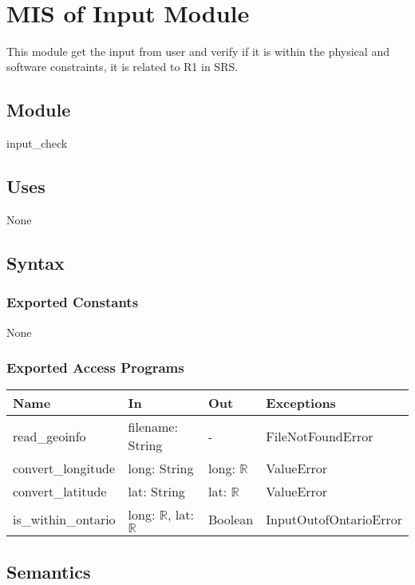 \documentclass[12pt, titlepage]{article}
\begin{document}
~\newpage

\section{MIS of Input Module} \label{inputModule} 
This module get the input from user and verify if it is within the physical and software constraints, it is related to R1 in SRS.
\subsection{Module}
input\_check
\subsection{Uses}
None

\subsection{Syntax}

\subsubsection{Exported Constants}
None

\subsubsection{Exported Access Programs}

\begin{center}
\begin{tabular}{p{4cm} p{3.5cm} p{1.5cm} p{4.5cm}}
\hline
\textbf{Name} & \textbf{In} & \textbf{Out} & \textbf{Exceptions} \\
\hline
read\_geoinfo & filename: String & - & FileNotFoundError\\
convert\_longitude & long: String & long: $\mathbb{R}$ & ValueError \\
convert\_latitude & lat: String & lat: $\mathbb{R}$ & ValueError \\
is\_within\_ontario & long: $\mathbb{R}$, lat: $\mathbb{R}$ & Boolean & InputOutofOntarioError \\

\hline
\end{tabular}
\end{center}

\subsection{Semantics}
\end{document}
